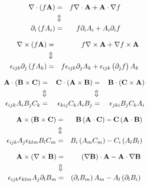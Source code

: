 \begin{eqnarray}
\nabla\cdot\left(f\mathbf{ A}\right) & = & 
f\nabla\cdot\mathbf{ A}+\mathbf{ A}\cdot\nabla f\nonumber \\
 & \Updownarrow\\
\partial_{i}\left(fA_{i}\right) & = & 
f\partial_{i}A_{i}+A_{i}\partial_{i}f\nonumber
\end{eqnarray}



\begin{eqnarray}
\nabla\times\left(f\mathbf{ A}\right) & = & f\nabla\times\mathbf{ A}+\nabla 
f\times\mathbf{ A}\nonumber \\
 & \Updownarrow\\
\epsilon_{ijk}\partial_{j}\left(fA_{k}\right) & = & 
f\epsilon_{ijk}\partial_{j}A_{k}+\epsilon_{ijk}\left(\partial_{j}f\right)A_{k}
\nonumber
\end{eqnarray}



\begin{alignat}{3}
\mathbf{ A}\cdot\left(\mathbf{ B}\times\mathbf{ C}\right) & = & 
\,\mathbf{ C}\cdot\left(\mathbf{ A}\times\mathbf{ B}\right) & = & 
\,\mathbf{ B}\cdot\left(\mathbf{ C}\times\mathbf{ A}\right)\nonumber \\
 & \Updownarrow &  & \Updownarrow\\
\epsilon_{ijk}A_{i}B_{j}C_{k} & = & \epsilon_{kij}C_{k}A_{i}B_{j} & = & 
\epsilon_{jki}B_{j}C_{k}A_{i}\nonumber
\end{alignat}



\begin{eqnarray}
\mathbf{ A}\times\left(\mathbf{ B}\times\mathbf{ C}\right) & = & 
\mathbf{ B}\left(\mathbf{ A}\cdot\mathbf{ C}\right)-\mathbf{ C}\left(\mathbf{ A}
\cdot\mathbf{ B}\right)\nonumber \\
 & \Updownarrow\\
\epsilon_{ijk}A_{j}\epsilon_{klm}B_{l}C_{m} & = & 
B_{i}\left(A_{m}C_{m}\right)-C_{i}\left(A_{l}B_{l}\right)\nonumber
\end{eqnarray}



\begin{eqnarray}
\mathbf{ A}\times\left(\nabla\times\mathbf{ B}\right) & = & 
\left(\nabla\mathbf{ B}\right)\cdot\mathbf{ A}-\mathbf{ A}\cdot\nabla\mathbf{ B}
\nonumber \\
 & \Updownarrow\\
\epsilon_{ijk}\epsilon_{klm}A_{j}\partial_{l}B_{m} & = & 
\left(\partial_{i}B_{m}\right)A_{m}-A_{l}\left(\partial_{l}B_{i}\right)\nonumber
\end{eqnarray}



